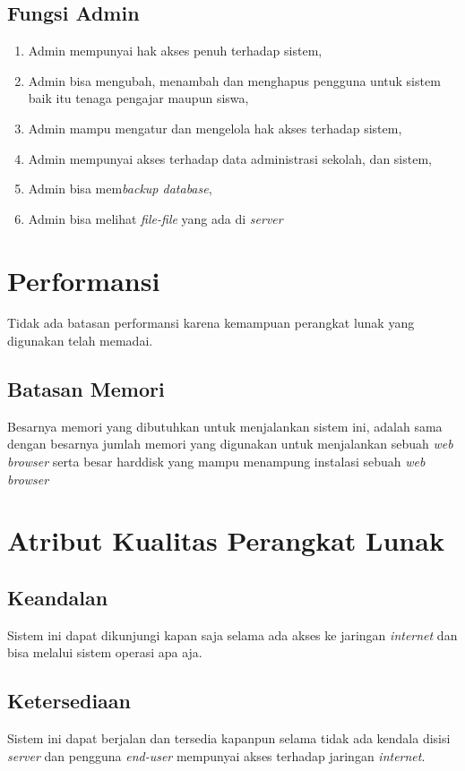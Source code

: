 \documentclass{scrreprt}
\begin{document}
	\subsection{Fungsi Admin}
	
	\begin{enumerate}
		\item Admin mempunyai hak akses penuh terhadap sistem,
		\item Admin bisa mengubah, menambah dan menghapus pengguna untuk sistem baik itu tenaga pengajar maupun siswa,
		\item Admin mampu mengatur dan mengelola hak akses terhadap sistem,
		\item Admin mempunyai akses terhadap data administrasi sekolah, dan sistem,
		\item Admin bisa mem\emph{backup database},
		\item Admin bisa melihat \emph{file-file} yang ada di \emph{server}
	\end{enumerate}
	
\section{Performansi}
Tidak ada batasan performansi karena kemampuan perangkat lunak yang digunakan telah memadai.

	\subsection{Batasan Memori}
	Besarnya memori yang dibutuhkan untuk menjalankan sistem ini, adalah sama dengan besarnya jumlah memori yang digunakan untuk menjalankan sebuah \emph{web browser} serta besar harddisk yang mampu menampung instalasi sebuah \emph{web browser}
	
\section{Atribut Kualitas Perangkat Lunak}

	\subsection{Keandalan}
	Sistem ini dapat dikunjungi kapan saja selama ada akses ke jaringan \emph{internet} dan bisa melalui sistem operasi apa aja.
	
	\subsection{Ketersediaan}
	Sistem ini dapat berjalan dan tersedia kapanpun selama tidak ada kendala disisi \emph{server} dan pengguna \emph{end-user} mempunyai akses terhadap jaringan \emph{internet}.
	
\end{document}
